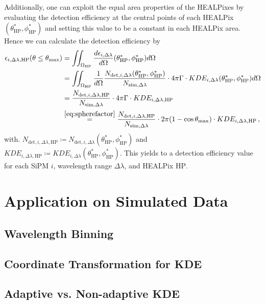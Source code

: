 Additionally, one can exploit the equal area properties of the HEALPixes by evaluating the detection efficiency at the central points of each HEALPix $(\theta^\ast_\text{HP},\phi^\ast_\text{HP})$ and setting this value to be a constant in each HEALPix area. Hence we can calculate the detection efficiency by
\begin{align}
	\epsilon_{i,\Delta\lambda,\text{HP}}(\theta\leq\theta_\text{max}) &= \iint_{\Omega_\text{HP}}  \frac{d\epsilon_{i,\Delta\lambda}}{d\Omega}(\theta^\ast_\text{HP},\phi^\ast_\text{HP}) d\Omega\nonumber\\
	&= \iint_{\Omega_\text{HP}}\frac{1}{d\Omega}\frac{N_{\text{det},i,\Delta\lambda}(\theta^\ast_\text{HP},\phi^\ast_\text{HP})}{N_{\text{sim},\Delta\lambda}}\cdot 4\pi\Gamma\cdot KDE_{i,\Delta\lambda}(\theta^\ast_\text{HP},\phi^\ast_\text{HP})d\Omega\nonumber\\
	&= \frac{N_{\text{det},i,\Delta\lambda,\text{HP}}}{N_{\text{sim},\Delta\lambda}}\cdot 4\pi\Gamma\cdot KDE_{i,\Delta\lambda,\text{HP}}\nonumber\\
	&\overset{\eqref{eq:spherefactor}}{=} \frac{N_{\text{det},i,\Delta\lambda,\text{HP}}}{N_{\text{sim},\Delta\lambda}}\cdot 2\pi(1-\cos\theta_\text{max})\cdot KDE_{i,\Delta\lambda,\text{HP}}\,,
\end{align}
with. $N_{\text{det},i,\Delta\lambda,\text{HP}}\coloneqq N_{\text{det},i,\Delta\lambda}(\theta^\ast_\text{HP},\phi^\ast_\text{HP})$ and $KDE_{i,\Delta\lambda,\text{HP}}\coloneqq KDE_{i,\Delta\lambda}(\theta^\ast_\text{HP},\phi^\ast_\text{HP})$. This yields to a detection efficiency value for each SiPM $i$, wavelength range $\Delta\lambda$, and HEALPix $\text{HP}$.

\section{Application on Simulated Data}

\subsection{Wavelength Binning}

\subsection{Coordinate Transformation for KDE}

\subsection{Adaptive vs. Non-adaptive KDE}

